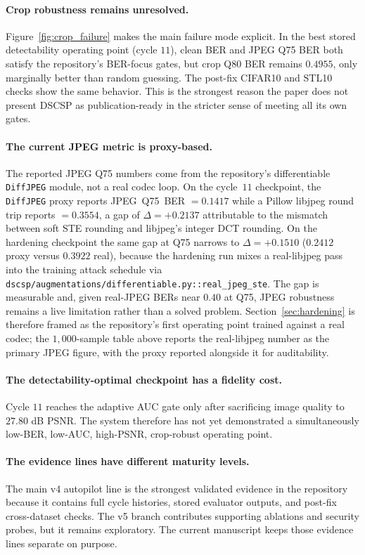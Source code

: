 \documentclass[journal]{IEEEtran}
\begin{document}
\paragraph{Crop robustness remains unresolved.}
Figure~\ref{fig:crop_failure} makes the main failure mode explicit. In the best stored detectability operating point (cycle $11$), clean BER and JPEG Q75 BER both satisfy the repository's BER-focus gates, but crop Q80 BER remains $0.4955$, only marginally better than random guessing. The post-fix CIFAR10 and STL10 checks show the same behavior. This is the strongest reason the paper does not present DSCSP as publication-ready in the stricter sense of meeting all its own gates.

\paragraph{The current JPEG metric is proxy-based.}
The reported JPEG Q75 numbers come from the repository's differentiable \texttt{DiffJPEG} module, not a real codec loop. On the cycle~$11$ checkpoint, the \texttt{DiffJPEG} proxy reports JPEG~Q75~BER $=0.1417$ while a Pillow libjpeg round trip reports $=0.3554$, a gap of $\Delta = +0.2137$ attributable to the mismatch between soft STE rounding and libjpeg's integer DCT rounding. On the hardening checkpoint the same gap at Q75 narrows to $\Delta = +0.1510$ ($0.2412$ proxy versus $0.3922$ real), because the hardening run mixes a real-libjpeg pass into the training attack schedule via \texttt{dscsp/augmentations/differentiable.py::real\_jpeg\_ste}. The gap is measurable and, given real-JPEG BERs near $0.40$ at Q75, JPEG robustness remains a live limitation rather than a solved problem. Section~\ref{sec:hardening} is therefore framed as the repository's first operating point trained against a real codec; the $1{,}000$-sample table above reports the real-libjpeg number as the primary JPEG figure, with the proxy reported alongside it for auditability.

\paragraph{The detectability-optimal checkpoint has a fidelity cost.}
Cycle $11$ reaches the adaptive AUC gate only after sacrificing image quality to $27.80$ dB PSNR. The system therefore has not yet demonstrated a simultaneously low-BER, low-AUC, high-PSNR, crop-robust operating point.

\paragraph{The evidence lines have different maturity levels.}
The main v4 autopilot line is the strongest validated evidence in the repository because it contains full cycle histories, stored evaluator outputs, and post-fix cross-dataset checks. The v5 branch contributes supporting ablations and security probes, but it remains exploratory. The current manuscript keeps those evidence lines separate on purpose.
\end{document}
